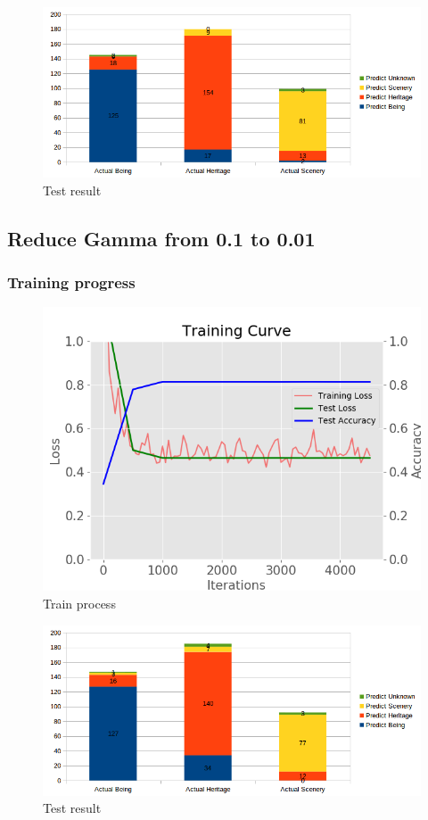 \documentclass[11pt]{article}
\begin{document}
\begin{figure}[H]
\centering
\includegraphics[width=1\textwidth]{images/result_large_dataset}
\caption{Test result}
\end{figure}

\subsection{Reduce Gamma from 0.1 to 0.01}

\subsubsection{Training progress}

\begin{figure}[H]
\centering
\includegraphics[width=1\textwidth]{images/train_large_dataset_gamma_0_01}
\caption{Train process}
\end{figure}

\begin{figure}[H]
\centering
\includegraphics[width=1\textwidth]{images/test_large_dataset_gamma_0_01}
\caption{Test result}
\end{figure}
\end{document}
